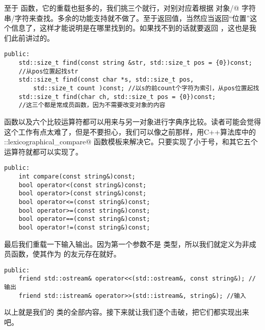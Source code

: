 至于 \lstinline@find@ 函数，它的重载也挺多的，我们挑三个就行，对别对应着根据 \lstinline@string@ 对象/\lstinline@char[N]@ 字符串/字符来查找。多余的功能支持就不做了。至于返回值，当然应当返回``位置''这个信息了，这样才能说明是在哪里找到的。如果找不到的话就要返回 \lstinline@npos@，这也是我们此前讲过的。
\begin{lstlisting}
public:
    std::size_t find(const string &str, std::size_t pos = {0})const;
    //从pos位置起找str
    std::size_t find(const char *s, std::size_t pos,
        std::size_t count )const; //以s的前count个字符为索引，从pos位置起找
    std::size_t find(char ch, std::size_t pos = {0})const;
    //这三个都是常成员函数，因为不需要改变对象的内容
\end{lstlisting}\par
\lstinline@compare@ 函数以及六个比较运算符都可以用来与另一对象进行字典序比较。读者可能会觉得这个工作有点太难了，但是不要担心，我们可以像之前那样，用C++算法库中的 \lstinline@std::lexicographical_compare@ 函数模板来解决它。只要实现了小于号，\lstinline@compare@ 和其它五个运算符就都可以实现了。
\begin{lstlisting}
public:
    int compare(const string&)const;
    bool operator<(const string&)const;
    bool operator>(const string&)const;
    bool operator<=(const string&)const;
    bool operator>=(const string&)const;
    bool operator==(const string&)const;
    bool operator!=(const string&)const;
\end{lstlisting}\par
最后我们重载一下输入输出。因为第一个参数不是 \lstinline@string@ 类型，所以我们就定义为非成员函数，使其作为 \lstinline@string@ 的友元存在就好。
\begin{lstlisting}
public:
    friend std::ostream& operator<<(std::ostream&, const string&); //输出
    friend std::istream& operator>>(std::istream&, string&); //输入
\end{lstlisting}\par
以上就是我们的 \lstinline@string@ 类的全部内容。接下来就让我们逐个击破，把它们都实现出来吧。\par
